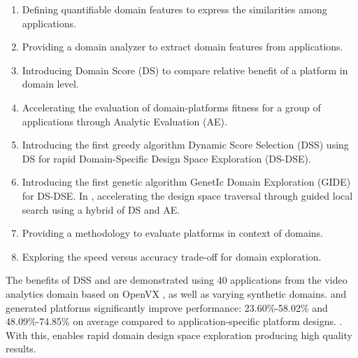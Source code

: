\begin{enumerate}
    \item Defining quantifiable domain features to express the similarities among applications.
    \item Providing a domain analyzer to extract domain features from applications.
    \item Introducing Domain Score (DS) to compare relative benefit of a platform in domain level.
    \item Accelerating the evaluation of domain-platforms fitness for a group of applications through Analytic Evaluation (AE).
    \item Introducing the first greedy algorithm Dynamic Score Selection (DSS) using DS for rapid Domain-Specific Design Space Exploration (DS-DSE).
    \item Introducing the first genetic algorithm GenetIc Domain Exploration (GIDE) for DS-DSE. In \ga, accelerating the design space traversal through guided local search using a hybrid of DS and AE.
    \item Providing a methodology to evaluate platforms in context of domains.
    \item Exploring the speed versus accuracy trade-off for domain exploration.
\end{enumerate}


The benefits of DSS and \ga are demonstrated using 40 applications from the video analytics domain based on OpenVX \cite{Intel, AMD}, as well as varying synthetic domains. 
 and \ga generated platforms significantly improve performance: 23.60\%-58.02\% and 48.09\%-74.85\% on average compared to application-specific platform designs.
.  \ga {}
With this, \ga enables rapid domain design space exploration producing high quality results.

